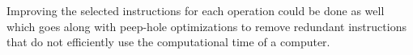 \documentclass[12pt, oneside]{article}   	%
\begin{document}
Improving the selected instructions for each operation could be done as well which goes along with peep-hole optimizations to remove redundant instructions that do not efficiently use the computational time of a computer.


\begin{flushleft}
	
	
\end{flushleft}
\end{document}
